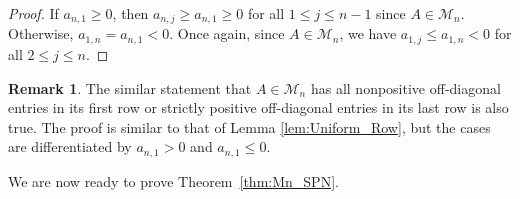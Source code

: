 \documentclass{amsart}
\newcommand{\cM}{\mathcal{M}}
\theoremstyle{definition}
\newtheorem{remark}[theorem]{Remark}
\begin{document}
\begin{proof}
If $a_{n,1} \geq 0$, then $a_{n,j}\geq a_{n,1}\geq 0$ for all $1\leq j\leq n-1$ since $A \in \mathcal{M}_n$. Otherwise, $a_{1,n} = a_{n,1} < 0$. Once again, since $A \in \cM_n$, we have $a_{1,j}\leq a_{1,n} < 0$ for all $2 \leq j \leq n$. 
\end{proof}

\begin{remark}\label{rem:Uniform_Row_Alternate}
The similar statement that $A \in \cM_n$ has all nonpositive off-diagonal entries in its first row or strictly positive off-diagonal entries in its last row is also true. The proof is similar to that of Lemma \ref{lem:Uniform_Row}, but the cases are differentiated by $a_{n,1} > 0$ and $a_{n,1}\leq 0$. 
\end{remark}

We are now ready to prove Theorem~\ref{thm:Mn_SPN}.
\end{document}
